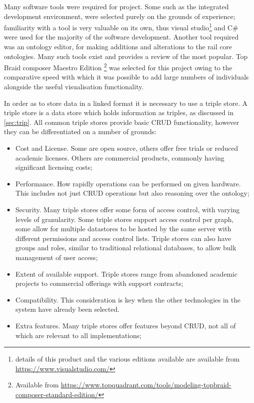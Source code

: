 Many software tools were required for project. Some such as the integrated development environment, were selected purely on the grounds of experience; familiarity with a tool is very valuable on its own, thus visual studio\footnote{details of this product and the various editions available are available from \url{https://www.visualstudio.com/}} and C\# were used for the majority of the software development. Another tool required was an ontology editor, for making additions and alterations to the rail core ontologies. Many such tools exist and \citet{Erlingsson2016} provides a review of the most popular. Top Braid composer Maestro Edition \footnote{Available from \url{https://www.topquadrant.com/tools/modeling-topbraid-composer-standard-edition/}} was selected for this project owing to the comparative speed with which it was possible to add large numbers of individuals alongside the useful visualisation functionality. 

In order as to store data in a linked format it is necessary to use a triple store. A triple store is a data store which holds information as triples, as discussed in \autoref{sec:trip}. All common triple stores provide basic CRUD functionality, however they can be differentiated on a number of grounds: 

\begin{itemize}    
    \item Cost and License. Some are open source, others offer free trials or reduced academic licenses. Others are commercial products, commonly having significant licensing costs;
    \item Performance. How rapidly operations can be performed on given hardware. This includes not just CRUD operations but also reasoning over the ontology;
    \item Security. Many triple stores offer some form of access control, with varying levels of granularity. Some triple stores support access control per graph, some allow for multiple datastores to be hosted by the same server with different permissions and access control lists. Triple stores can also have groups and roles, similar to traditional relational databases, to allow bulk management of user access;
    \item Extent of available support. Triple stores range from abandoned academic projects to commercial offerings with support contracts;
    \item Compatibility. This consideration is key when the other technologies in the system have already been selected.
    \item Extra features. Many triple stores offer features beyond CRUD, not all of which are relevant to all implementations;
\end{itemize}

